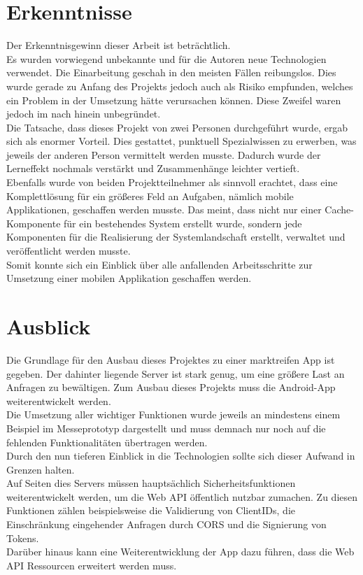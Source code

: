 \section{Erkenntnisse}
\label{sec:erkenntnisse}
Der Erkenntnisgewinn dieser Arbeit ist beträchtlich. \\
Es wurden vorwiegend unbekannte und für die Autoren neue Technologien verwendet. Die Einarbeitung geschah in den meisten Fällen reibungslos. Dies wurde gerade zu Anfang des Projekts jedoch auch als Risiko empfunden, welches ein Problem in der Umsetzung hätte verursachen können. Diese Zweifel waren jedoch im nach hinein unbegründet. \\
Die Tatsache, dass dieses Projekt von zwei Personen durchgeführt wurde, ergab sich als enormer Vorteil. Dies gestattet, punktuell Spezialwissen zu erwerben, was jeweils der anderen Person vermittelt werden musste. Dadurch wurde der Lerneffekt nochmals verstärkt und Zusammenhänge leichter vertieft.\\
Ebenfalls wurde von beiden Projektteilnehmer als sinnvoll erachtet, dass eine Komplettlösung für ein größeres Feld an Aufgaben, nämlich mobile Applikationen, geschaffen werden musste. Das meint, dass nicht nur einer Cache-Komponente für ein bestehendes System erstellt wurde, sondern jede Komponenten für die Realisierung der Systemlandschaft erstellt, verwaltet und veröffentlicht werden musste.\\
Somit konnte sich ein Einblick über alle anfallenden Arbeitsschritte zur Umsetzung einer mobilen Applikation geschaffen werden. 
\section{Ausblick}
\label{sec:ausblick}
Die Grundlage für den Ausbau dieses Projektes zu einer marktreifen \gls{App} ist gegeben. Der dahinter liegende Server ist stark genug, um eine größere Last an Anfragen zu bewältigen. Zum Ausbau dieses Projekts muss die \gls{Android}-\gls{App} weiterentwickelt werden. \\
Die Umsetzung aller wichtiger Funktionen wurde jeweils an mindestens einem Beispiel im Messeprototyp dargestellt und muss demnach nur noch auf die fehlenden Funktionalitäten übertragen werden.\\
Durch den nun tieferen Einblick in die Technologien sollte sich dieser Aufwand in Grenzen halten.\\
Auf Seiten dies Servers müssen hauptsächlich Sicherheitsfunktionen weiterentwickelt werden, um die Web API öffentlich nutzbar zumachen. Zu diesen Funktionen zählen beispielsweise die Validierung von ClientIDs, die Einschränkung eingehender Anfragen durch \ac{CORS} und die Signierung von Tokens. \\
Darüber hinaus kann eine Weiterentwicklung der App dazu führen, dass die Web \ac{API} Ressourcen erweitert werden muss. 